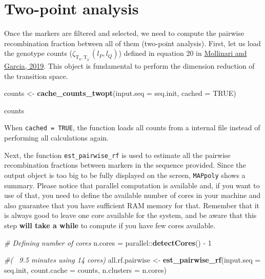 \documentclass[
]{article}
\newenvironment{Shaded}{}{}
\newcommand{\CommentTok}[1]{\textcolor[rgb]{0.38,0.63,0.69}{\textit{#1}}}
\newcommand{\DataTypeTok}[1]{\textcolor[rgb]{0.56,0.13,0.00}{#1}}
\newcommand{\DecValTok}[1]{\textcolor[rgb]{0.25,0.63,0.44}{#1}}
\newcommand{\KeywordTok}[1]{\textcolor[rgb]{0.00,0.44,0.13}{\textbf{#1}}}
\newcommand{\NormalTok}[1]{#1}
\newcommand{\OperatorTok}[1]{\textcolor[rgb]{0.40,0.40,0.40}{#1}}
\newcommand{\OtherTok}[1]{\textcolor[rgb]{0.00,0.44,0.13}{#1}}
\newcommand{\StringTok}[1]{\textcolor[rgb]{0.25,0.44,0.63}{#1}}
\begin{document}
\hypertarget{two-point-analysis}{%
\section{Two-point analysis}\label{two-point-analysis}}

Once the markers are filtered and selected, we need to compute the
pairwise recombination fraction between all of them (two-point
analysis). First, let us load the genotype counts
(\(\zeta_{\mbox{T}_{k},\mbox{T}_{k^{\prime}}}(l_{P}, l_{Q})\)) defined
in equation 20 in \href{https://doi.org/10.1534/g3.119.400378}{Mollinari
and Garcia, 2019}. This object is fundamental to perform the dimension
reduction of the transition space.

\begin{Shaded}
\begin{Highlighting}[]
\NormalTok{counts <-}\StringTok{ }\KeywordTok{cache_counts_twopt}\NormalTok{(}\DataTypeTok{input.seq =}\NormalTok{ seq.init, }\DataTypeTok{cached =} \OtherTok{TRUE}\NormalTok{)}
\end{Highlighting}
\end{Shaded}

\begin{Shaded}
\begin{Highlighting}[]
\NormalTok{counts}
\end{Highlighting}
\end{Shaded}

When \texttt{cached\ =\ TRUE}, the function loads all counts from a
internal file instead of performing all calculations again.

Next, the function \texttt{est\_pairwise\_rf} is used to estimate all
the pairwise recombination fractions between markers in the sequence
provided. Since the output object is too big to be fully displayed on
the screen, \texttt{MAPpoly} shows a summary. Please notice that
parallel computation is available and, if you want to use of that, you
need to define the available number of cores in your machine and also
guarantee that you have sufficient RAM memory for that. Remember that it
is always good to leave one core available for the system, and be aware
that this step \textbf{will take a while} to compute if you have few
cores available.

\begin{Shaded}
\begin{Highlighting}[]
\CommentTok{# Defining number of cores}
\NormalTok{n.cores =}\StringTok{ }\NormalTok{parallel}\OperatorTok{::}\KeywordTok{detectCores}\NormalTok{() }\OperatorTok{-}\StringTok{ }\DecValTok{1}

\CommentTok{#(~ 9.5 minutes using 14 cores)}
\NormalTok{all.rf.pairwise <-}\StringTok{ }\KeywordTok{est_pairwise_rf}\NormalTok{(}\DataTypeTok{input.seq =}\NormalTok{ seq.init, }
                                   \DataTypeTok{count.cache =}\NormalTok{ counts, }
                                   \DataTypeTok{n.clusters =}\NormalTok{ n.cores)}
\end{Highlighting}
\end{Shaded}
\end{document}
